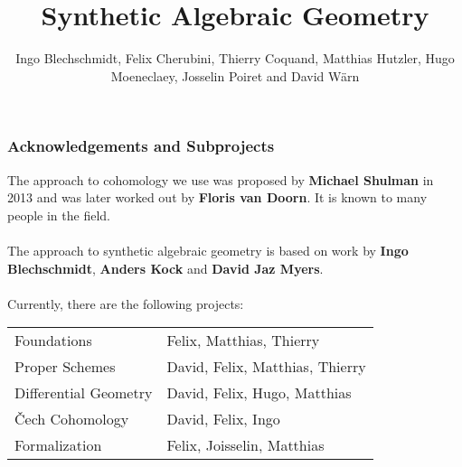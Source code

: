 \documentclass{beamer}
\title[ConCoh]
{Synthetic Algebraic Geometry}
\author[Author, Anders] 
{Ingo Blechschmidt, Felix Cherubini, Thierry Coquand, Matthias Hutzler, Hugo Moeneclaey, Josselin Poiret and David Wärn}
\institute
{Working on various sub-projects}
\begin{document}
\date{}
\begin{frame}
  \titlepage
\end{frame}

\begin{frame}
  \frametitle{Acknowledgements and Subprojects}
  The approach to cohomology we use was proposed by \textbf{Michael Shulman} in 2013 and was later worked out by \textbf{Floris van Doorn}.
  It is known to many people in the field. \\ ~\\
  \pause
  The approach to synthetic algebraic geometry is based on work by  \textbf{Ingo Blechschmidt}, \textbf{Anders Kock} and \textbf{David Jaz Myers}. \\  ~\\
  \pause
  Currently, there are the following projects:
  \begin{table}
    \centering
    \begin{tabular}{lp{7.5cm}}
      Foundations & Felix, Matthias, Thierry \\
      Proper Schemes & David, Felix, Matthias, Thierry \\
      Differential Geometry & David, Felix, Hugo, Matthias \\
      \v{C}ech Cohomology & David, Felix, Ingo \\
      Formalization & Felix, Joisselin, Matthias \\
    \end{tabular}
  \end{table}
  
\end{frame}
\end{document}
